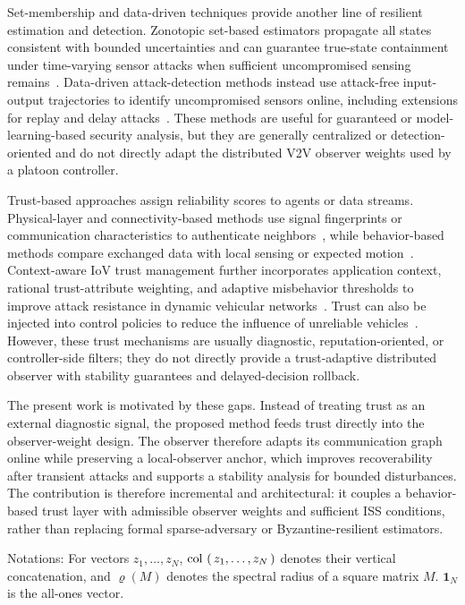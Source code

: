 \documentclass[letterpaper,journal]{IEEEtran}
\def\col#1{\mathop{{\rm col}\,\left(\,#1\,\right)}}
\begin{document}
Set-membership and data-driven techniques provide another line of resilient estimation and detection. Zonotopic set-based estimators propagate all states consistent with bounded uncertainties and can guarantee true-state containment under time-varying sensor attacks when sufficient uncompromised sensing remains~\cite{niazi2023resilient_set}. Data-driven attack-detection methods instead use attack-free input-output trajectories to identify uncompromised sensors online, including extensions for replay and delay attacks~\cite{coimbatore2025data_driven_attack}. These methods are useful for guaranteed or model-learning-based security analysis, but they are generally centralized or detection-oriented and do not directly adapt the distributed V2V observer weights used by a platoon controller.

Trust-based approaches assign reliability scores to agents or data streams. Physical-layer and connectivity-based methods use signal fingerprints or communication characteristics to authenticate neighbors~\cite{trust_physic_connecte,KF_chisquare_meusure}, while behavior-based methods compare exchanged data with local sensing or expected motion~\cite{trust_simple,trust_complex}. Context-aware IoV trust management further incorporates application context, rational trust-attribute weighting, and adaptive misbehavior thresholds to improve attack resistance in dynamic vehicular networks~\cite{siddiqui2023trust_vehicles}. Trust can also be injected into control policies to reduce the influence of unreliable vehicles~\cite{self-belive,Enhancing_control_trust}. However, these trust mechanisms are usually diagnostic, reputation-oriented, or controller-side filters; they do not directly provide a trust-adaptive distributed observer with stability guarantees and delayed-decision rollback.

The present work is motivated by these gaps. Instead of treating trust as an external diagnostic signal, the proposed method feeds trust directly into the observer-weight design. The observer therefore adapts its communication graph online while preserving a local-observer anchor, which improves recoverability after transient attacks and supports a stability analysis for bounded disturbances. The contribution is therefore incremental and architectural: it couples a behavior-based trust layer with admissible observer weights and sufficient ISS conditions, rather than replacing formal sparse-adversary or Byzantine-resilient estimators.

Notations: For vectors $z_1,\ldots,z_N$, $\col{z_1,\ldots,z_N}$ denotes their vertical concatenation, and $\varrho(M)$ denotes the spectral radius of a square matrix $M$. $\mathbf{1}_N$ is the all-ones vector.
\end{document}
